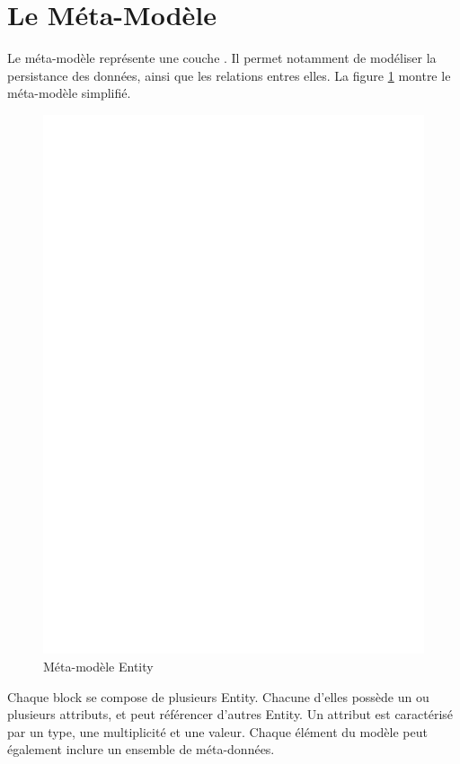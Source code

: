 \section{Le Méta-Modèle \kwentity{}}\label{sub:ent}


Le méta-modèle \kwentity{} représente une couche . Il permet notamment de modéliser la persistance des données, ainsi que les relations entres elles. La figure \ref{fig:ent}  montre le méta-modèle \kwentity{} simplifié.

\begin{figure}[h]
  \centering
  \includegraphics[scale=.4]{img/Entity.eps}
  \caption{Méta-modèle Entity}
  \label{fig:ent}
\end{figure}

Chaque block se compose de plusieurs Entity. Chacune d'elles possède un ou plusieurs attributs, et peut référencer d'autres Entity. Un attribut est caractérisé par un type, une multiplicité et une valeur. Chaque élément du modèle peut également inclure un ensemble de méta-données.

